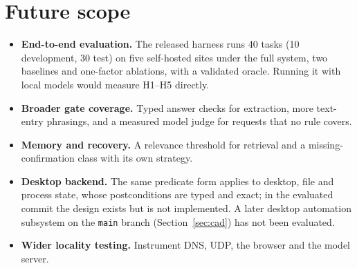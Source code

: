 \section{Future scope}
\label{sec:harness}
\begin{itemize}
\item \textbf{End-to-end evaluation.} The released harness runs 40 tasks (10 development, 30 test) on five self-hosted sites under the full system, two baselines and one-factor ablations, with a validated oracle. Running it with local models would measure H1--H5 directly.
\item \textbf{Broader gate coverage.} Typed answer checks for extraction, more text-entry phrasings, and a measured model judge for requests that no rule covers.
\item \textbf{Memory and recovery.} A relevance threshold for retrieval and a missing-confirmation class with its own strategy.
\item \textbf{Desktop backend.} The same predicate form applies to desktop, file and process state, whose postconditions are typed and exact; in the evaluated commit the design exists but is not implemented. A later desktop automation subsystem on the \texttt{main} branch (Section~\ref{sec:cad}) has not been evaluated.
\item \textbf{Wider locality testing.} Instrument DNS, UDP, the browser and the model server.
\end{itemize}
